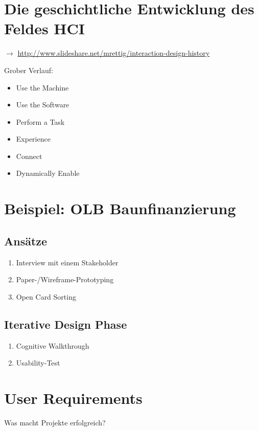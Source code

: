 \section{Die geschichtliche Entwicklung des Feldes HCI}

$\rightarrow$
\url{http://www.slideshare.net/mrettig/interaction-design-history}

Grober Verlauf:

\begin{itemize}
\item
  Use the Machine
\item
  Use the Software
\item
  Perform a Task
\item
  Experience
\item
  Connect
\item
  Dynamically Enable
\end{itemize}

\section{Beispiel: OLB Baunfinanzierung}

\subsection{Ansätze}

\begin{enumerate}[1.]
\item
  Interview mit einem Stakeholder
\item
  Paper-/Wireframe-Prototyping
\item
  Open Card Sorting
\end{enumerate}

\subsection{Iterative Design Phase}

\begin{enumerate}[1.]
\item
  Cognitive Walkthrough
\item
  Usability-Test
\end{enumerate}

\section{User Requirements}

Was macht Projekte erfolgreich?


